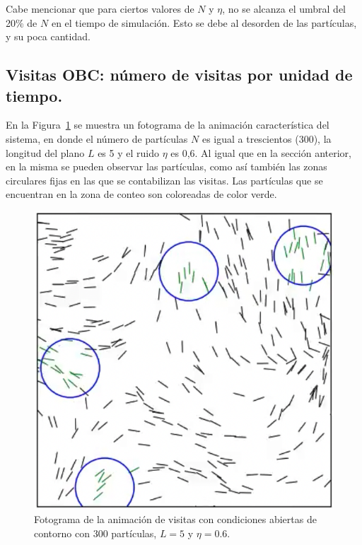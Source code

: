 \documentclass[11pt, a4paper]{article}
\begin{document}
            Cabe mencionar que para ciertos valores de $N$ y $\eta$, no se alcanza el umbral del 20\% de $N$ en el tiempo de simulación.
            Esto se debe al desorden de las partículas, y su poca cantidad.

        \subsection{Visitas OBC: número de visitas por unidad de tiempo.}
        \label{subsec:resultados-visitas-obc}

            En la Figura~\ref{fig:visitas_obc_1} se muestra un fotograma de la animación característica del sistema, en donde
            el número de partículas $N$ es igual a trescientos (300), la longitud del plano $L$ es 5 y el ruido $\eta$ es 0,6.
            Al igual que en la sección anterior, en la misma se pueden observar las partículas, como así también las
            zonas circulares fijas en las que se contabilizan las visitas.
            Las partículas que se encuentran en la zona de conteo son coloreadas de color verde.

            \begin{figure}[H]
                \centering
                \includegraphics[width=\textwidth]{./animation_visits_obc-n300-eta0p6-frame}
                \caption{Fotograma de la animación de visitas con condiciones abiertas de contorno con $300$ partículas, $L = 5$ y $\eta = 0.6$.}
                \label{fig:visitas_obc_1}
            \end{figure}
\end{document}
